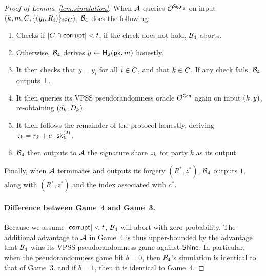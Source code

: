 \begin{proof}[Proof of Lemma~\ref{lem:simulation}]
  When $\mathcal{A}$ queries $\mathcal{O}^{\mathsf{Sign}_2}$ on input
  $(k, m, C, \{ (y_i, R_i) \}_{i \in C})$,
  $\mathcal{B}_4$ does the following:
  \begin{enumerate}
    \item Checks if $\lvert C \cap \mathsf{corrupt} \rvert < t$,
    if the check does not hold, $\mathcal{B}_4$ aborts.
    \item Otherwise, $\mathcal{B}_4$ derives $y \gets \mathsf{H}_2(\mathsf{pk}, m)$ honestly.
    \item It then checks that $y = y_i$ for all $i \in C$,
    and that $k \in C$.
    If any check fails, $\mathcal{B}_4$ outputs $\bot$.
    \item It then queries
    its VPSS pseudorandomness oracle $\mathcal{O}^{\mathsf{Gen}}$ again on input $(k, y)$,
    re-obtaining $(d_k, D_k)$.
    \item It then follows the remainder of the protocol honestly,
    deriving $z_k = r_k + c \cdot \mathsf{sk}^{(2)}_k$.
    \item $\mathcal{B}_4$ then outputs to $\mathcal{A}$ the signature share $z_k$ for party $k$ as its output.
  \end{enumerate}

%
  Finally, when $\mathcal{A}$ terminates and outputs its forgery $(R^*, z^*)$,
  $\mathcal{B}_4$ outputs $1$, along with $(R^*, z^*)$ and the index associated with $c^*$.

  \paragraph{Difference between Game~4 and Game~3.}
  Because we assume $\lvert \mathsf{corrupt} \rvert < t$,
  $\mathcal{B}_4$ will abort with zero probability.
  The additional advantage to $\mathcal{A}$ in Game~4 is thus upper-bounded by the advantage that $\mathcal{B}_4$ wins its VPSS pseudorandomness game against $\mathsf{Shine}$.
  In particular, when the pseudorandomness game bit $b=0$,
  then $\mathcal{B}_4$'s simulation is identical to that of Game~3.
  and if $b=1$, then it is identical to Game~4.


\end{proof}
